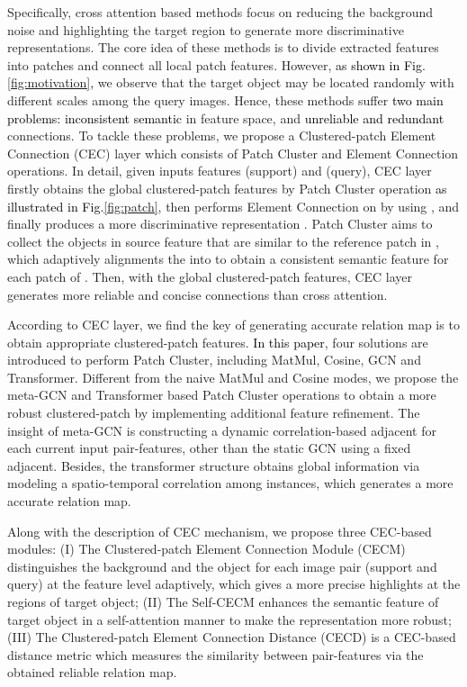 \documentclass{article}
\newcommand{\ljx}[1]{\textcolor{black}{#1}}
\newcommand{\seasons}[1]{\textcolor{black}{#1}}
\begin{document}
Specifically, cross attention based methods \cite{hou2019cross,xu2021learning,xu2021Rectifying} focus on reducing the background noise and highlighting the target region to generate more discriminative representations.
The core idea of these methods is to divide extracted features into patches and connect all local patch features.
However, \ljx{as shown in Fig.\ref{fig:motivation},} we observe that the target object may be located randomly with different scales among the query images. Hence, these methods suffer \seasons{two main problems: inconsistent semantic} in feature space, and \seasons{unreliable and redundant} connections.
To tackle these problems, we propose a Clustered-patch Element Connection (CEC) layer which consists of Patch Cluster and Element Connection operations.
In detail, given inputs features  (support) and  (query), CEC layer firstly obtains the global clustered-patch  features by Patch Cluster operation \ljx{as illustrated in Fig.\ref{fig:patch}}, then performs Element Connection on  by using , and finally produces a more discriminative representation .
Patch Cluster aims to collect the objects in source feature  that are similar to the reference patch in , which adaptively alignments the  into  to obtain a consistent semantic feature for each patch of . Then, with the global clustered-patch features, CEC layer generates more reliable and concise connections than cross attention.

According to CEC layer, we find the key of generating accurate relation map is to obtain appropriate clustered-patch features. \ljx{In this paper}, four solutions are introduced to perform Patch Cluster, including MatMul, Cosine, GCN and Transformer. Different from the naive MatMul and Cosine modes, we propose the meta-GCN and Transformer based Patch Cluster operations to obtain a more robust clustered-patch by implementing additional feature refinement.
The insight of meta-GCN is constructing a dynamic correlation-based adjacent for each current input pair-features, other than the static GCN \cite{kipf2017semi} using a fixed adjacent.
Besides, the transformer structure obtains global information via modeling a spatio-temporal correlation among instances, which generates a more accurate relation map.

Along with the description of CEC mechanism, we propose three CEC-based modules:
(I) The Clustered-patch Element Connection Module (CECM) distinguishes the background and the object for each image pair (support and query) at the feature level adaptively, which gives a more precise highlights at the regions of target object;
(II) The Self-CECM enhances the semantic feature of target object in a self-attention manner to make the representation more robust;
(III) The Clustered-patch Element Connection Distance (CECD) is a CEC-based distance metric which measures the similarity between pair-features via the obtained reliable relation map.
\end{document}
